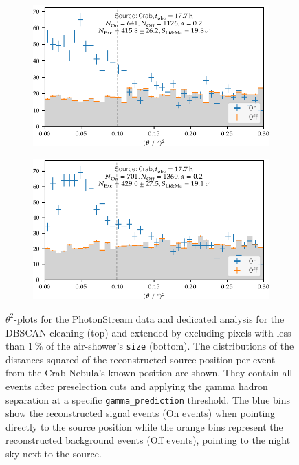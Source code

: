 \begin{figure}
  \begin{subfigure}{\textwidth}
    \centering
    \includegraphics[width=\textwidth]{Plots/results/DBSCAN/theta2_plot.pdf}
  \end{subfigure}
  \begin{subfigure}{\textwidth}
    \centering
    \includegraphics[width=\textwidth]{Plots/results/DBSCAN_perc/theta2_plot.pdf}
  \end{subfigure}
  \caption{$\theta^2$-plots for the PhotonStream data and dedicated analysis for the DBSCAN cleaning (top) and extended by excluding pixels with less than $\SI{1}{\percent}$ of the air-shower's \texttt{size} (bottom). The distributions of the distances squared of the reconstructed source position per event from the Crab Nebula's known position are shown. They contain all events after preselection cuts and applying the gamma hadron separation at a specific \texttt{gamma\_prediction} threshold. The blue bins show the reconstructed signal events (On events) when pointing directly to the source position while the orange bins represent the reconstructed background events (Off events), pointing to the night sky next to the source.}
  \label{fig:theta2}
\end{figure}
%

